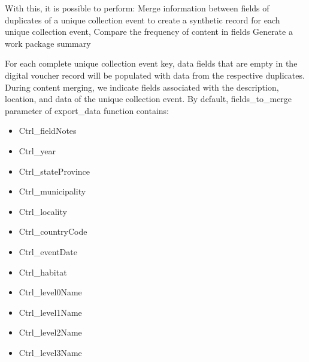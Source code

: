 \documentclass[a4paper]{book}
\begin{document}
\begin{Description}
\begin{enumerate}
\end{enumerate}


With this, it is possible to perform:
Merge information between fields of duplicates of a unique collection event to create a synthetic record for each unique collection event,
Compare the frequency of content in fields
Generate a work package summary

For each complete unique collection event key, data fields that are empty in the digital voucher record will be populated with data from the respective duplicates.
During content merging, we indicate fields associated with the description, location, and data of the unique collection event.
By default, fields\_to\_merge parameter of export\_data function contains:
\begin{itemize}

\item{} Ctrl\_fieldNotes
\item{} Ctrl\_year
\item{} Ctrl\_stateProvince
\item{} Ctrl\_municipality
\item{} Ctrl\_locality
\item{} Ctrl\_countryCode
\item{} Ctrl\_eventDate
\item{} Ctrl\_habitat
\item{} Ctrl\_level0Name
\item{} Ctrl\_level1Name
\item{} Ctrl\_level2Name
\item{} Ctrl\_level3Name

\end{itemize}

\end{Description}
%
\end{document}
